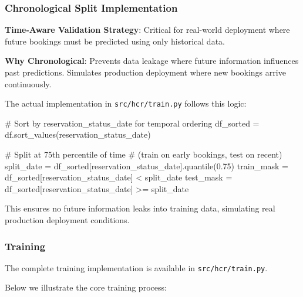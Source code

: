 \documentclass[
  letterpaper,
  DIV=11,
  numbers=noendperiod]{scrartcl}
\newenvironment{Shaded}{\begin{snugshade}}{\end{snugshade}}
\newcommand{\CommentTok}[1]{\textcolor[rgb]{0.37,0.37,0.37}{#1}}
\newcommand{\FloatTok}[1]{\textcolor[rgb]{0.68,0.00,0.00}{#1}}
\newcommand{\NormalTok}[1]{\textcolor[rgb]{0.00,0.23,0.31}{#1}}
\newcommand{\OperatorTok}[1]{\textcolor[rgb]{0.37,0.37,0.37}{#1}}
\newcommand{\StringTok}[1]{\textcolor[rgb]{0.13,0.47,0.30}{#1}}
\renewenvironment{Shaded}{%
  \begin{tcolorbox}[%
    enhanced,%
    colback=codebg,%
    colframe=codebg,%
    borderline west={3pt}{0pt}{sectionblue},%
    fontupper=\small\ttfamily,%
    boxrule=0pt,%
    arc=0pt,%
    boxsep=5pt,%
    left=2mm,%
    right=2mm,%
    top=2mm,%
    bottom=2mm%
  ]%
}{%
  \end{tcolorbox}%
}
\begin{document}
\subsubsection{Chronological Split
Implementation}\label{chronological-split-implementation}

\textbf{Time-Aware Validation Strategy}: Critical for real-world
deployment where future bookings must be predicted using only historical
data.

\textbf{Why Chronological}: Prevents data leakage where future
information influences past predictions. Simulates production deployment
where new bookings arrive continuously.

The actual implementation in \texttt{src/hcr/train.py} follows this
logic:

\begin{Shaded}
\begin{Highlighting}[]
\CommentTok{\# Sort by reservation\_status\_date for temporal ordering}
\NormalTok{df\_sorted }\OperatorTok{=}\NormalTok{ df.sort\_values(}\StringTok{\textquotesingle{}reservation\_status\_date\textquotesingle{}}\NormalTok{)}

\CommentTok{\# Split at 75th percentile of time }
\CommentTok{\# (train on early bookings, test on recent)}
\NormalTok{split\_date }\OperatorTok{=}\NormalTok{ df\_sorted[}\StringTok{\textquotesingle{}reservation\_status\_date\textquotesingle{}}\NormalTok{].quantile(}\FloatTok{0.75}\NormalTok{)}
\NormalTok{train\_mask }\OperatorTok{=}\NormalTok{ df\_sorted[}\StringTok{\textquotesingle{}reservation\_status\_date\textquotesingle{}}\NormalTok{] }\OperatorTok{\textless{}}\NormalTok{ split\_date}
\NormalTok{test\_mask }\OperatorTok{=}\NormalTok{ df\_sorted[}\StringTok{\textquotesingle{}reservation\_status\_date\textquotesingle{}}\NormalTok{] }\OperatorTok{\textgreater{}=}\NormalTok{ split\_date}
\end{Highlighting}
\end{Shaded}

This ensures no future information leaks into training data, simulating
real production deployment conditions.

\subsubsection{Training}\label{training-1}

The complete training implementation is available in
\texttt{src/hcr/train.py}.

Below we illustrate the core training process:
\end{document}
